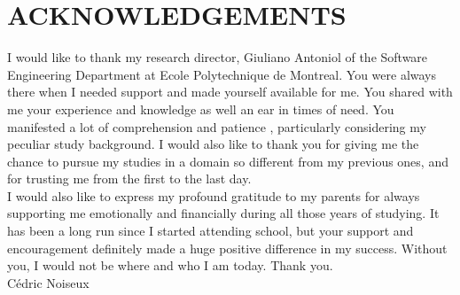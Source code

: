 %
\chapter*{ACKNOWLEDGEMENTS}\thispagestyle{headings}
%

I would like to thank my research director, Giuliano Antoniol of the Software Engineering Department at Ecole Polytechnique de Montreal. You were always there when I needed support and made yourself available for me. You shared with me your experience and knowledge as well an ear in times of need. You manifested a lot of comprehension and patience , particularly considering my peculiar study background. I would also like to thank you for giving me the chance to pursue my studies in a domain so different from my previous ones, and for trusting me from the first to the last day. \\

I would also like to express my profound gratitude to my parents for always supporting me emotionally and financially during all those years of studying. It has been a long run since I started attending school, but your support and encouragement definitely made a huge positive difference in my success. Without you, I would not be where and who I am today. Thank you. \\

C\'{e}dric Noiseux